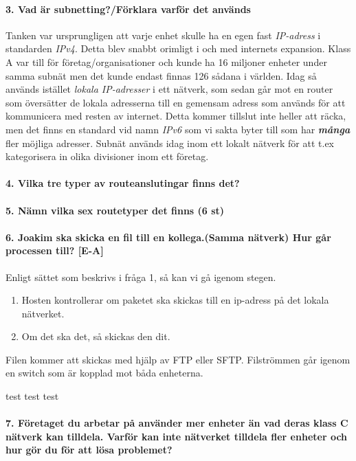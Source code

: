 \paragraph{3. Vad är subnetting?/Förklara varför det används}
Tanken var ursprungligen att varje enhet skulle ha en egen fast \textit{IP-adress} i standarden \textit{IPv4}. Detta blev snabbt orimligt i och med internets expansion. Klass A var till för företag/organisationer och kunde ha 16 miljoner enheter under samma subnät men det kunde endast finnas 126 sådana i världen. Idag så används istället \textit{lokala IP-adresser} i ett nätverk, som sedan går mot en router som översätter de lokala adresserna till en gemensam adress som används för att kommunicera med resten av internet. Detta kommer tillslut inte heller att räcka, men det finns en standard vid namn \textit{IPv6} som vi sakta byter till som har \textbf{\textit{många}} fler möjliga adresser. Subnät används idag inom ett lokalt nätverk för att t.ex kategorisera in olika divisioner inom ett företag.

\paragraph{4. Vilka tre typer av routeanslutingar finns det?}
 

\paragraph{5. Nämn vilka sex routetyper det finns (6 st)}
\paragraph{6. Joakim ska skicka en fil till en kollega.(Samma nätverk) Hur går processen till? [E-A]}

Enligt sättet som beskrivs i fråga 1, så kan vi gå igenom stegen.

\begin{enumerate}
	\item Hosten kontrollerar om paketet ska skickas till en ip-adress på det lokala nätverket.
	\item Om det ska det, så skickas den dit.
\end{enumerate}

Filen kommer att skickas med hjälp av FTP eller SFTP. Filströmmen går igenom en switch som är kopplad mot båda enheterna.

test test test

\paragraph{7. Företaget du arbetar på använder mer enheter än vad deras klass C nätverk kan tilldela. Varför kan inte nätverket tilldela fler enheter och hur gör du för att lösa problemet?}

